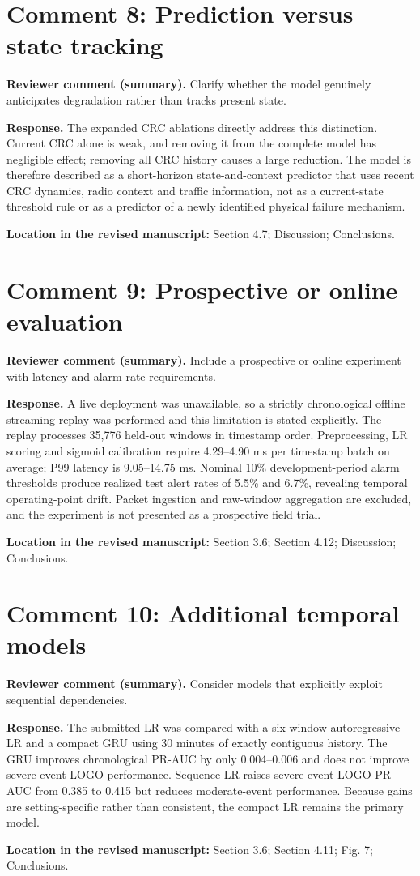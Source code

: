 \documentclass[11pt]{article}
\newcommand{\ReviewerComment}[1]{\par\noindent\textcolor{reviewblue}{\textbf{Reviewer comment (summary).}} #1\par}
\newcommand{\AuthorResponse}[1]{\par\noindent\textcolor{responsegreen}{\textbf{Response.}} #1\par}
\newcommand{\Location}[1]{\par\noindent\textbf{Location in the revised manuscript:} #1\par}
\begin{document}
\section*{Comment 8: Prediction versus state tracking}
\ReviewerComment{Clarify whether the model genuinely anticipates degradation rather than tracks present state.}
\AuthorResponse{The expanded CRC ablations directly address this distinction. Current CRC alone is weak, and removing it from the complete model has negligible effect; removing all CRC history causes a large reduction. The model is therefore described as a short-horizon state-and-context predictor that uses recent CRC dynamics, radio context and traffic information, not as a current-state threshold rule or as a predictor of a newly identified physical failure mechanism.}
\Location{Section 4.7; Discussion; Conclusions.}

\section*{Comment 9: Prospective or online evaluation}
\ReviewerComment{Include a prospective or online experiment with latency and alarm-rate requirements.}
\AuthorResponse{A live deployment was unavailable, so a strictly chronological offline streaming replay was performed and this limitation is stated explicitly. The replay processes 35,776 held-out windows in timestamp order. Preprocessing, LR scoring and sigmoid calibration require 4.29--4.90 ms per timestamp batch on average; P99 latency is 9.05--14.75 ms. Nominal 10\% development-period alarm thresholds produce realized test alert rates of 5.5\% and 6.7\%, revealing temporal operating-point drift. Packet ingestion and raw-window aggregation are excluded, and the experiment is not presented as a prospective field trial.}
\Location{Section 3.6; Section 4.12; Discussion; Conclusions.}

\section*{Comment 10: Additional temporal models}
\ReviewerComment{Consider models that explicitly exploit sequential dependencies.}
\AuthorResponse{The submitted LR was compared with a six-window autoregressive LR and a compact GRU using 30 minutes of exactly contiguous history. The GRU improves chronological PR-AUC by only 0.004--0.006 and does not improve severe-event LOGO performance. Sequence LR raises severe-event LOGO PR-AUC from 0.385 to 0.415 but reduces moderate-event performance. Because gains are setting-specific rather than consistent, the compact LR remains the primary model.}
\Location{Section 3.6; Section 4.11; Fig. 7; Conclusions.}
\end{document}
